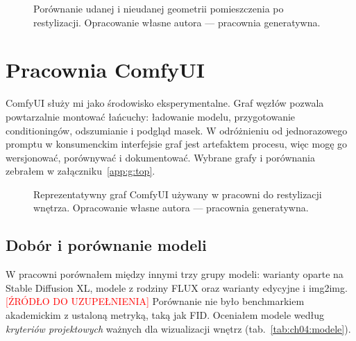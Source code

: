 \begin{figure}[htbp]
  \centering
  \caption{Porównanie udanej i nieudanej geometrii pomieszczenia po restylizacji.
  Opracowanie własne autora --- pracownia generatywna.}
  \label{fig:ch04:geometry}
\end{figure}

\section{Pracownia ComfyUI}
\label{ch04:sec:comfyui}

ComfyUI służy mi jako środowisko eksperymentalne. Graf węzłów pozwala powtarzalnie montować łańcuchy: ładowanie modelu, przygotowanie conditioningów, odszumianie i podgląd masek.
W odróżnieniu od jednorazowego promptu w konsumenckim interfejsie graf jest artefaktem procesu, więc mogę go wersjonować, porównywać i dokumentować. Wybrane grafy i porównania zebrałem w załączniku~\ref{app:g:top}.

\begin{figure}[htbp]
  \centering
  \caption{Reprezentatywny graf ComfyUI używany w pracowni do restylizacji wnętrza.
  Opracowanie własne autora --- pracownia generatywna.}
  \label{fig:ch04:comfyui-graph}
\end{figure}

\subsection{Dobór i porównanie modeli}
\label{ch04:sec:modele}

W pracowni porównałem między innymi trzy grupy modeli: warianty oparte na Stable Diffusion XL, modele z rodziny FLUX oraz warianty edycyjne i img2img. \textcolor{red}{[ŹRÓDŁO DO UZUPEŁNIENIA]}
Porównanie nie było benchmarkiem akademickim z ustaloną metryką, taką jak FID. Oceniałem modele według \emph{kryteriów projektowych} ważnych dla wizualizacji wnętrz (tab.~\ref{tab:ch04:modele}).

